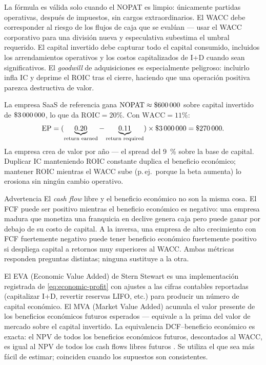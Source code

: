 La fórmula es válida solo cuando el NOPAT es limpio: únicamente partidas operativas, después de
impuestos, sin cargos extraordinarios. El WACC debe corresponder al riesgo de los flujos de caja
que se evalúan --- usar el WACC corporativo para una división nueva y especulativa subestima el
umbral requerido. El capital invertido debe capturar todo el capital consumido, incluidos los
arrendamientos operativos y los costos capitalizados de I+D cuando sean significativos. El
\emph{goodwill} de adquisiciones es especialmente peligroso: incluirlo infla IC y deprime el ROIC
tras el cierre, haciendo que una operación positiva parezca destructiva de valor.

\begin{example}
La empresa SaaS de referencia gana \(\mathrm{NOPAT}\approx\$\num{600000}\) sobre capital
invertido de \(\$\num{3000000}\), lo que da \(\mathrm{ROIC}=20\%\). Con \(\mathrm{WACC}=11\%\):
\[
  \mathrm{EP}
    = (\underbrace{0.20}_{\text{return earned}} - \underbrace{0.11}_{\text{return required}})
      \times \$\num{3000000}
    = \$\num{270000}.
\]
La empresa crea  de valor por año --- el spread del \qty{9}{\percent}
sobre la base de capital. Duplicar IC manteniendo ROIC constante duplica el beneficio económico;
mantener ROIC mientras el WACC sube (p.\,ej.\ porque la beta aumenta) lo erosiona sin ningún
cambio operativo.
\end{example}

\begin{admonition}{Advertencia}
El \emph{cash flow} libre y el beneficio económico no son la misma cosa. El FCF puede ser positivo
mientras el beneficio económico es negativo: una empresa madura que monetiza una franquicia en
declive genera caja pero puede ganar por debajo de su costo de capital. A la inversa, una empresa
de alto crecimiento con FCF fuertemente negativo puede tener beneficio económico fuertemente
positivo si despliega capital a retornos muy superiores al WACC. Ambas métricas responden
preguntas distintas; ninguna sustituye a la otra.
\end{admonition}

El EVA (Economic Value Added) de Stern Stewart es una implementación registrada de
\cref{eq:economic-profit} con ajustes a las cifras contables reportadas (capitalizar I+D, revertir
reservas LIFO, etc.) para producir un número de capital económico. El MVA (Market Value Added)
acumula el valor presente de los beneficios económicos futuros esperados --- equivale a la prima
del valor de mercado sobre el capital invertido. La equivalencia DCF--beneficio económico es
exacta: el NPV de todos los beneficios económicos futuros, descontados al WACC, es igual al NPV
de todos los cash flows libres futuros \parencite{brealey2020}. Se utiliza el que sea más
fácil de estimar; coinciden cuando los supuestos son consistentes.

